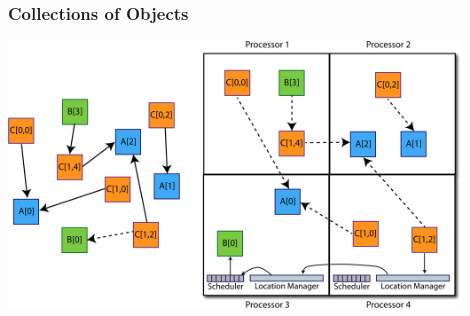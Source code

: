 \begin{frame}[fragile]
  \frametitle{Collections of Objects}
  \begin{center}\includegraphics[width=0.9\textwidth]{figures/elements2.pdf}\end{center}
\end{frame}




